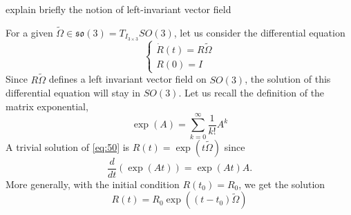 \begin{ndrva}
  explain briefly the notion of left-invariant vector field 
\end{ndrva}
For a given $\tilde \Omega \in \mathfrak{so}(3)=T_{I_{3\times3}} SO(3) $, let us consider the differential equation
\begin{equation}
  \label{eq:50}
  \begin{cases}
    \dot R(t) = R \tilde \Omega\\
    R(0) = I
  \end{cases}
\end{equation}
Since $R \tilde \Omega$ defines a left invariant vector field on $SO(3)$, the solution of this differential equation will stay in $SO(3)$. Let us recall the definition of the matrix exponential,
\begin{equation}
  \label{eq:53}
  \exp(A) = \sum_{k=0}^{\infty} \frac {1}{k!} A^k
\end{equation}
A trivial solution of \eqref{eq:50} is $R(t) = \exp(t\tilde\Omega) $ since
\begin{equation}
  \label{eq:51}
  \frac {d}{dt}(\exp(At)) = \exp(At) A.
\end{equation}
More generally, with the initial condition $R(t_0)= R_0$, we get the solution
\begin{equation}
R(t) = R_0 \exp((t-t_0)\tilde\Omega)\label{eq:54}
\end{equation}



